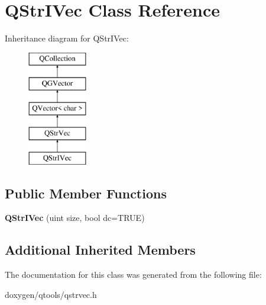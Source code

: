 \hypertarget{class_q_str_i_vec}{}\section{Q\+Str\+I\+Vec Class Reference}
\label{class_q_str_i_vec}
Inheritance diagram for Q\+Str\+I\+Vec\+:\begin{figure}[H]
\begin{center}
\leavevmode
\includegraphics[height=5.000000cm]{class_q_str_i_vec}
\end{center}
\end{figure}
\subsection*{Public Member Functions}
\begin{DoxyCompactItemize}
\item 
\mbox{\label{class_q_str_i_vec_a7b12e499adfa405480b1e6508a2bcf48}} 
{\bfseries Q\+Str\+I\+Vec} (uint size, bool dc=T\+R\+UE)
\end{DoxyCompactItemize}
\subsection*{Additional Inherited Members}


The documentation for this class was generated from the following file\+:\begin{DoxyCompactItemize}
\item 
doxygen/qtools/qstrvec.\+h\end{DoxyCompactItemize}
